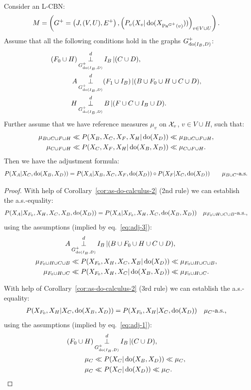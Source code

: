\begin{Thm}
    \label{thm-gen-adjustment}
Consider an L-CBN:
        \[M= \left ( G^+=\left ( J,(V,U),E^+ \right ), \left ( P_v ( X_v|\operatorname{do}( X_{\mathrm{Pa}^{G^+}(v)})) \right )_{v \in V \cup U} \right ).\]
    Assume that all the following conditions hold in the graphs $G^+_{\operatorname{do}(I_B,D)}$: 
    \begin{align}
        (F_0 \cup H) & \operatorname*{\perp}^d_{G^+_{\operatorname{do}(I_B,D)}} I_B \operatorname*{|} (C \cup D), \label{eq:adj-1} \\
        A & \operatorname*{\perp}^d_{G^+_{\operatorname{do}(I_B,D)}} (F_1 \cup I_B) \operatorname*{|} (B \cup F_0 \cup H \cup C \cup D),\label{eq:adj-3} \\
       H &\operatorname*{\perp}^d_{G^+_{\operatorname{do}(I_B,D)}} B \operatorname*{|} (F \cup C \cup  I_B \cup D). \label{eq:adj-5} 
   \end{align}
   Further assume that we have reference measures $\mu_v$ on $\mathcal{X}_v$, $v \in V \cup H$, such that:
  \begin{align*}
      \mu_{B \cup C \cup F \cup H} &\ll  P(X_B,X_C,X_F,X_H|\operatorname{do}(X_D)) \ll \mu_{B \cup C \cup F \cup H},\\
      \mu_{C \cup F \cup H} &\ll  P(X_C,X_F,X_H|\operatorname{do}(X_B,X_D)) \ll \mu_{C \cup F \cup H}.
  \end{align*}
    Then we have the adjustment formula: 
    \[ P(X_A|X_C,\operatorname{do}(X_B,X_D)) = P(X_A|X_B,X_C,X_F,\operatorname{do}(X_D)) \circ P(X_F|X_C,\operatorname{do}(X_D)) \qquad  \mu_{B \cup C}\text{-a.s.} \]
\begin{proof}
With help of Corollary~\ref{cor:as-do-calculus-2} (2nd rule) we can establish the a.s.-equality:
    \begin{align}
        P(X_A|X_{F_0},X_H,X_C,X_B,\operatorname{do}(X_D)) &= P(X_A|X_{F_0},X_H,X_C,\operatorname{do}(X_B,X_D)) &\mu_{F_0 \cup H \cup C \cup B} \text{-a.s.,} \label{eq:adj-eq-6}
    \end{align}
    using the assumptions (implied by eq.\ \ref{eq:adj-3}):
\begin{align*}
    A & \operatorname*{\perp}^d_{G^+_{\operatorname{do}(I_B,D)}} I_B \operatorname*{|} (B \cup F_0 \cup H \cup C \cup D),\\
\mu_{F_0 \cup H \cup C \cup B} & \ll P(X_{F_0},X_H,X_C,X_B|\operatorname{do}(X_D)) \ll \mu_{F_0 \cup H \cup C \cup B},\\
\mu_{F_0 \cup H \cup C} & \ll P(X_{F_0},X_H,X_C|\operatorname{do}(X_B,X_D)) \ll \mu_{F_0 \cup H \cup C}.
\end{align*}

With help of Corollary~\ref{cor:as-do-calculus-2} (3rd rule) we can establish the a.s.-equality:
    \begin{align}
        P(X_{F_0},X_H|X_C,\operatorname{do}(X_B,X_D)) &= P(X_{F_0},X_H|X_C,\operatorname{do}(X_D)) 
         &\mu_C\text{-a.s.,} \label{eq:adj-eq-7}
    \end{align}
    using the assumptions (implied by eq.\ \ref{eq:adj-1}):
\begin{align*}
    (F_0 \cup H) & \operatorname*{\perp}^d_{G^+_{\operatorname{do}(I_B,D)}} I_B \operatorname*{|} (C \cup D),\\
    \mu_C & \ll P(X_C|\operatorname{do}(X_B,X_D)) \ll \mu_C,\\
    \mu_C & \ll P(X_C|\operatorname{do}(X_D)) \ll \mu_C.
\end{align*}


\end{proof}
\end{Thm}
